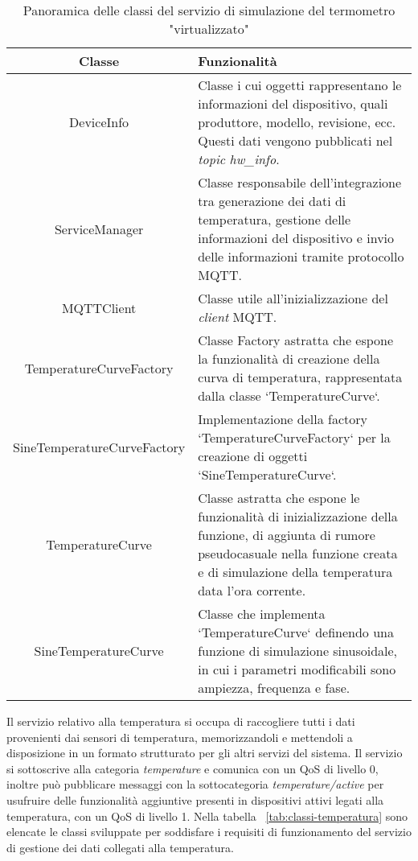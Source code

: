 \begin{table}[H]
\caption{Panoramica delle classi del servizio di simulazione del termometro "virtualizzato"}
\label{tab:classi-termometro}
\begin{tabularx}{\linewidth}{|c|X|}
\hline
\textbf{Classe} & \textbf{Funzionalità} \\
\hline
DeviceInfo & Classe i cui oggetti rappresentano le informazioni del dispositivo, quali produttore, modello, revisione, ecc. Questi dati vengono pubblicati nel \emph{topic} \emph{hw\_info}. \\
\hline
ServiceManager & Classe responsabile dell'integrazione tra generazione dei dati di temperatura, gestione delle informazioni del dispositivo e invio delle informazioni tramite protocollo MQTT. \\
\hline
MQTTClient & Classe utile all'inizializzazione del \emph{client} MQTT. \\
\hline
TemperatureCurveFactory & Classe Factory astratta che espone la funzionalità di creazione della curva di temperatura, rappresentata dalla classe `TemperatureCurve`. \\
\hline
SineTemperatureCurveFactory & Implementazione della factory `TemperatureCurveFactory` per la creazione di oggetti `SineTemperatureCurve`. \\
\hline
TemperatureCurve & Classe astratta che espone le funzionalità di inizializzazione della funzione, di aggiunta di rumore pseudocasuale nella funzione creata e di simulazione della temperatura data l'ora corrente. \\
\hline
SineTemperatureCurve & Classe che implementa `TemperatureCurve` definendo una funzione di simulazione sinusoidale, in cui i parametri modificabili sono ampiezza, frequenza e fase. \\
\hline
\end{tabularx}
\end{table}


Il servizio relativo alla temperatura si occupa di raccogliere tutti i dati provenienti dai sensori di temperatura, memorizzandoli e mettendoli a disposizione in un formato strutturato per gli altri servizi del sistema.
Il servizio si sottoscrive alla categoria \emph{temperature} e comunica con un QoS di livello 0, inoltre può pubblicare messaggi con la sottocategoria \emph{temperature/active} per usufruire delle funzionalità aggiuntive presenti in dispositivi attivi legati alla temperatura, con un QoS di livello 1.
Nella tabella ~\ref{tab:classi-temperatura} sono elencate le classi sviluppate per soddisfare i requisiti di funzionamento del servizio di gestione dei dati collegati alla temperatura.

